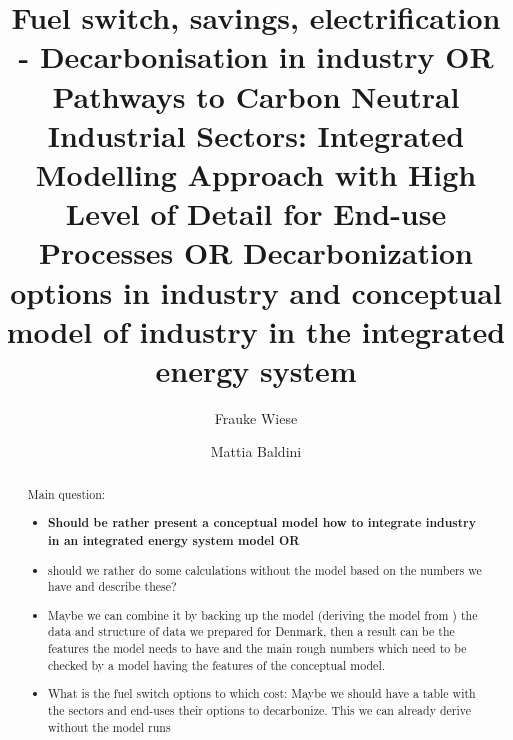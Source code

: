 \documentclass[review]{elsarticle}
\begin{document}
\begin{frontmatter}

\title{Fuel switch, savings, electrification - Decarbonisation in industry OR Pathways to Carbon Neutral Industrial Sectors: Integrated Modelling Approach with High Level of Detail for End-use Processes OR Decarbonization options in industry and conceptual model of industry in the integrated energy system}


\author[mymainaddress]{Frauke Wiese}

\author[mymainaddress]{Mattia Baldini}

\address[mymainaddress]{DTU Management Engineering, Technical University of Denmark}

\begin{abstract}



Main question:
\begin{itemize}
    \item \textbf{Should be rather present a conceptual model how to integrate industry in an integrated energy system model OR} 
    \item should we rather do some calculations without the model based on the numbers we have and describe these?
    \item Maybe we can combine it by backing up the model (deriving the model from ) the data and structure of data we prepared for Denmark, then a result can be the features the model needs to have and the main rough numbers which need to be checked by a model having the features of the conceptual model.
    \item What is the fuel switch options to which cost: Maybe we should have a table with the sectors and end-uses their options to decarbonize. This we can already derive without the model runs
\end{itemize}


\end{abstract}
\end{frontmatter}
\end{document}
